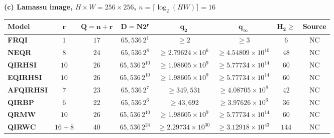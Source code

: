 \begin{table}
\par\vspace{0.3cm}
\textbf{(c) Lamassu image, $H\times W=256\times256$, $n=\lceil\log_2(HW)\rceil=16$}\\[3pt]
{\footnotesize\setlength{\tabcolsep}{4pt}
\begin{tabular}{lccccccc}
\hline\rowcolor{Bisque3}
\textbf{Model} & $\boldsymbol{r}$ & $\boldsymbol{Q=n+r}$ & $\boldsymbol{D=N2^r}$ & $\boldsymbol{q_2}$ & $\boldsymbol{q_\infty}$ & $\boldsymbol{H_2\geq}$ & \textbf{Source}\\
\hline
\textbf{FRQI} & \(1\) & \(17\) & \(65{,}536\,2^{1}\) & $\geq 2$ & $\geq 3$ & \(6\) & NC \\
\textbf{NEQR} & \(8\) & \(24\) & \(65{,}536\,2^{8}\) & $\geq 2.79624\times10^{6}$ & $\geq 4.54809\times10^{10}$ & \(48\) & NC \\
\textbf{QIRHSI} & \(10\) & \(26\) & \(65{,}536\,2^{10}\) & $\geq 1.98605\times10^{9}$ & $\geq 5.77734\times10^{14}$ & \(60\) & NC \\
\textbf{EQIRHSI} & \(10\) & \(26\) & \(65{,}536\,2^{10}\) & $\geq 1.98605\times10^{9}$ & $\geq 5.77734\times10^{14}$ & \(60\) & NC \\
\textbf{AFQIRHSI} & \(7\) & \(23\) & \(65{,}536\,2^{7}\) & $\geq 349{,}531$ & $\geq 4.08705\times10^{8}$ & \(42\) & NC \\
\textbf{QIRBP} & \(6\) & \(22\) & \(65{,}536\,2^{6}\) & $\geq 43{,}692$ & $\geq 3.97626\times10^{6}$ & \(36\) & NC \\
\textbf{QRMW} & \(10\) & \(26\) & \(65{,}536\,2^{10}\) & $\geq 1.98605\times10^{9}$ & $\geq 5.77734\times10^{14}$ & \(60\) & NC \\
\textbf{QIRWC} & \(16+8\) & \(40\) & \(65{,}536\,2^{24}\) & $\geq 2.29734\times10^{30}$ & $\geq 3.12918\times10^{43}$ & \(144\) & NC \\
\hline\end{tabular}}\par


\end{table}
